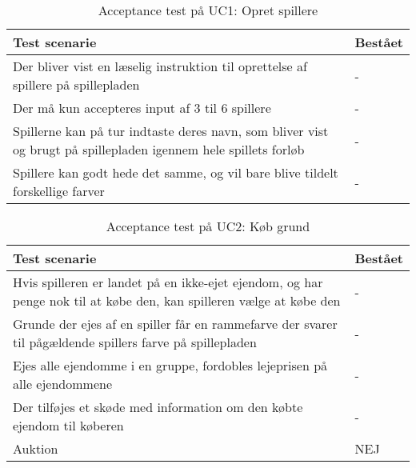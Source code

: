 \documentclass[class=article, crop=false]{standalone}
\begin{document}
    \begin{table}[H]
        \caption{Acceptance test på UC1: Opret spillere }
        \begin{tabularx}{\textwidth}{|X|l|}
            \hline
            \textbf{Test scenarie}       & \textbf{Bestået}   \\ \hline
            Der bliver vist en læselig instruktion til oprettelse af spillere på spillepladen     & - \\ \hline
            Der må kun accepteres input af 3 til 6 spillere    & - \\ \hline
            Spillerne kan på tur indtaste deres navn, som bliver vist og brugt på spillepladen igennem hele spillets forløb     & -  \\ \hline
            Spillere kan godt hede det samme, og vil bare blive tildelt forskellige farver     & - \\ \hline
        \end{tabularx}
    \end{table}


    \begin{table}[H]
        \caption{Acceptance test på UC2: Køb grund}
        \begin{tabularx}{\textwidth}{|X|l|}
            \hline
            \textbf{Test scenarie}       & \textbf{Bestået}   \\ \hline
            Hvis spilleren er landet på en ikke-ejet ejendom, og har penge nok til at købe den, kan spilleren vælge at købe den    & - \\ \hline
            Grunde der ejes af en spiller får en rammefarve der svarer til pågældende spillers farve på spillepladen    & - \\ \hline
            Ejes alle ejendomme i en gruppe, fordobles lejeprisen på alle ejendommene     & -  \\ \hline
            Der tilføjes et skøde med information om den købte ejendom til køberen     & - \\ \hline
            Auktion    & NEJ \\ \hline
        \end{tabularx}
    \end{table}
\end{document}
